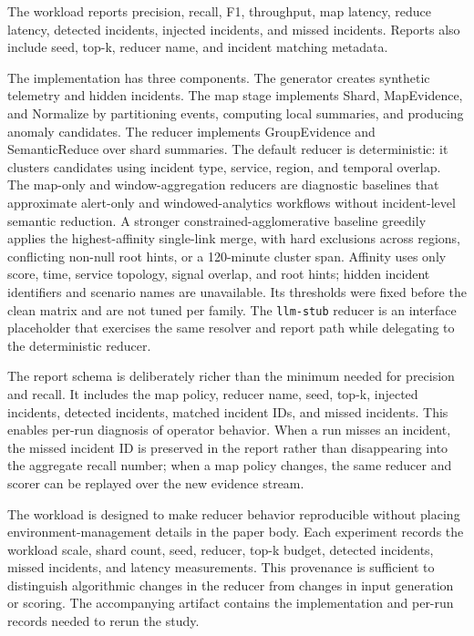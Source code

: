 \documentclass[sigplan,anonymous,nonacm]{acmart}
\begin{document}
The workload reports precision, recall, F1, throughput, map latency, reduce latency, detected incidents, injected incidents, and missed incidents. Reports also include seed, top-k, reducer name, and incident matching metadata.

The implementation has three components. The generator creates synthetic telemetry and hidden incidents. The map stage implements \textsf{Shard}, \textsf{MapEvidence}, and \textsf{Normalize} by partitioning events, computing local summaries, and producing anomaly candidates. The reducer implements \textsf{GroupEvidence} and \textsf{SemanticReduce} over shard summaries. The default reducer is deterministic: it clusters candidates using incident type, service, region, and temporal overlap. The map-only and window-aggregation reducers are diagnostic baselines that approximate alert-only and windowed-analytics workflows without incident-level semantic reduction. A stronger constrained-agglomerative baseline greedily applies the highest-affinity single-link merge, with hard exclusions across regions, conflicting non-null root hints, or a 120-minute cluster span. Affinity uses only score, time, service topology, signal overlap, and root hints; hidden incident identifiers and scenario names are unavailable. Its thresholds were fixed before the clean matrix and are not tuned per family. The \texttt{llm-stub} reducer is an interface placeholder that exercises the same resolver and report path while delegating to the deterministic reducer.

The report schema is deliberately richer than the minimum needed for precision and recall. It includes the map policy, reducer name, seed, top-k, injected incidents, detected incidents, matched incident IDs, and missed incidents. This enables per-run diagnosis of operator behavior. When a run misses an incident, the missed incident ID is preserved in the report rather than disappearing into the aggregate recall number; when a map policy changes, the same reducer and scorer can be replayed over the new evidence stream.

The workload is designed to make reducer behavior reproducible without placing environment-management details in the paper body. Each experiment records the workload scale, shard count, seed, reducer, top-k budget, detected incidents, missed incidents, and latency measurements. This provenance is sufficient to distinguish algorithmic changes in the reducer from changes in input generation or scoring. The accompanying artifact contains the implementation and per-run records needed to rerun the study.
\end{document}
